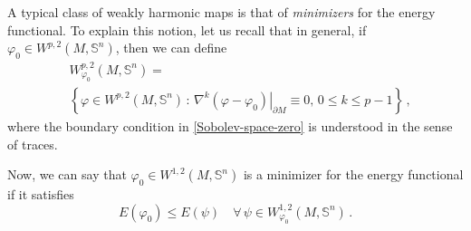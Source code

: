 \documentclass[11pt]{amsart}
\theoremstyle{plain}
\theoremstyle{definition}
\numberwithin{equation}{section}
\def \s{{\mathbb S}}
\numberwithin{equation}{section}
\begin{document}
A typical class of weakly harmonic maps is that of {\it minimizers} for the energy functional. To explain this notion, let us recall that in general, if $\varphi_0 \in W^{p,2}\left ( M,\s^n \right )$, then we can define
\begin{equation}\label{Sobolev-space-zero}
\begin{split}
&W_{\varphi_ 0}^{p,2}\left ( M,\s^n \right )=\\
&\left \{ \varphi \in W^{p,2}\left ( M,\s^n \right )\,: \, \left .\nabla^k\left(\varphi-\varphi_0 \right)\right |_{\partial M} \equiv 0,\,0 \leq k \leq p-1 \right \} \,,
\end{split}
\end{equation}
where the boundary condition in \eqref{Sobolev-space-zero} is understood in the sense of traces.

Now, we can say that ${\varphi_ 0} \in W^{1,2}\left ( M,\s^n \right )$ is a minimizer for the energy functional if it satisfies
\[
E(\varphi_0) \leq E(\psi) \quad \forall \,\psi \in W_{\varphi_0}^{1,2}\left ( M,\s^n \right )\,.
\]
\end{document}
